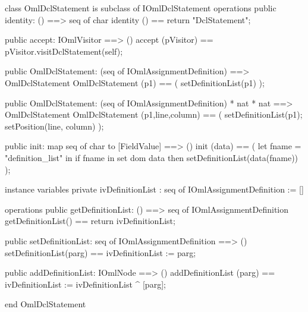 \begin{vdm_al}
class OmlDclStatement is subclass of IOmlDclStatement
operations
  public identity: () ==> seq of char
  identity () == return "DclStatement";

  public accept: IOmlVisitor ==> ()
  accept (pVisitor) == pVisitor.visitDclStatement(self);

  public OmlDclStatement:
    (seq of IOmlAssignmentDefinition) ==> OmlDclStatement
  OmlDclStatement (p1) == 
    ( setDefinitionList(p1) );

  public OmlDclStatement:
    (seq of IOmlAssignmentDefinition) *
    nat *
    nat ==> OmlDclStatement
  OmlDclStatement (p1,line,column) == 
    ( setDefinitionList(p1);
      setPosition(line, column) );

  public init: map seq of char to [FieldValue] ==> ()
  init (data) ==
    ( let fname = "definition_list" in
        if fname in set dom data
        then setDefinitionList(data(fname)) );

instance variables
  private ivDefinitionList : seq of IOmlAssignmentDefinition := []

operations
  public getDefinitionList: () ==> seq of IOmlAssignmentDefinition
  getDefinitionList() == return ivDefinitionList;

  public setDefinitionList: seq of IOmlAssignmentDefinition ==> ()
  setDefinitionList(parg) == ivDefinitionList := parg;

  public addDefinitionList: IOmlNode ==> ()
  addDefinitionList (parg) == ivDefinitionList := ivDefinitionList ^ [parg];

end OmlDclStatement
\end{vdm_al}

